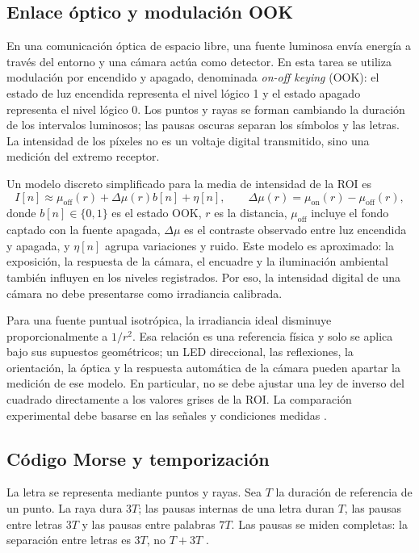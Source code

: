 \documentclass[11pt,a4paper]{article}
\begin{document}
\subsection{Enlace óptico y modulación OOK}
En una comunicación óptica de espacio libre, una fuente luminosa envía energía a través del entorno y una cámara actúa como detector. En esta tarea se utiliza modulación por encendido y apagado, denominada \textit{on-off keying} (OOK): el estado de luz encendida representa el nivel lógico 1 y el estado apagado representa el nivel lógico 0. Los puntos y rayas se forman cambiando la duración de los intervalos luminosos; las pausas oscuras separan los símbolos y las letras. La intensidad de los píxeles no es un voltaje digital transmitido, sino una medición del extremo receptor.

Un modelo discreto simplificado para la media de intensidad de la ROI es
\begin{equation}
I[n] \approx \mu_{\mathrm{off}}(r)
 + \Delta\mu(r)b[n] + \eta[n],
\qquad
\Delta\mu(r)=\mu_{\mathrm{on}}(r)-\mu_{\mathrm{off}}(r),
\label{eq:modelo-ook}
\end{equation}
donde \(b[n]\in\{0,1\}\) es el estado OOK, \(r\) es la distancia, \(\mu_{\mathrm{off}}\) incluye el fondo captado con la fuente apagada, \(\Delta\mu\) es el contraste observado entre luz encendida y apagada, y \(\eta[n]\) agrupa variaciones y ruido. Este modelo es aproximado: la exposición, la respuesta de la cámara, el encuadre y la iluminación ambiental también influyen en los niveles registrados. Por eso, la intensidad digital de una cámara no debe presentarse como irradiancia calibrada.

Para una fuente puntual isotrópica, la irradiancia ideal disminuye proporcionalmente a \(1/r^2\). Esa relación es una referencia física y solo se aplica bajo sus supuestos geométricos; un LED direccional, las reflexiones, la orientación, la óptica y la respuesta automática de la cámara pueden apartar la medición de ese modelo. En particular, no se debe ajustar una ley de inverso del cuadrado directamente a los valores grises de la ROI. La comparación experimental debe basarse en las señales y condiciones medidas \cite{NISTOptica}.

\subsection{Código Morse y temporización}
La letra se representa mediante puntos y rayas. Sea \(T\) la duración de referencia de un punto. La raya dura \(3T\); las pausas internas de una letra duran \(T\), las pausas entre letras \(3T\) y las pausas entre palabras \(7T\). Las pausas se miden completas: la separación entre letras es \(3T\), no \(T+3T\) \cite{Pauta,UIT}.
\end{document}
